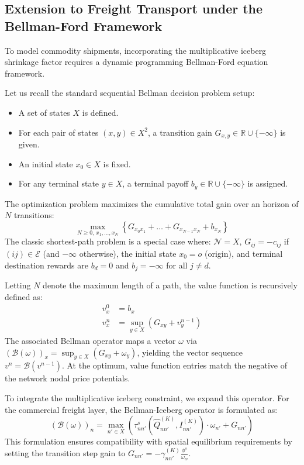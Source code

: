 \documentclass[11pt,a4paper]{article}
\begin{document}
\subsection{Extension to Freight Transport under the Bellman-Ford Framework}

To model commodity shipments, incorporating the multiplicative iceberg shrinkage factor requires a dynamic programming Bellman-Ford equation framework.

Let us recall the standard sequential Bellman decision problem setup:
\begin{itemize}
    \item A set of states $X$ is defined.
    \item For each pair of states $(x,y) \in X^2$, a transition gain $G_{x,y} \in \mathbb{R} \cup \{-\infty \}$ is given.
    \item An initial state $x_0 \in X$ is fixed.
    \item For any terminal state $y \in X$, a terminal payoff $b_y \in \mathbb{R} \cup \{ - \infty\}$ is assigned.
\end{itemize}
The optimization problem maximizes the cumulative total gain over an horizon of $N$ transitions:
\begin{equation}
    \max_{N \ge 0, \, x_1,\dots,x_N} \left\{ G_{x_0x_1} + \dots + G_{x_{N-1}x_N} + b_{x_N} \right\}
\end{equation}
The classic shortest-path problem is a special case where: $\mathcal{N} = X$, $G_{ij} = - c_{ij}$ if $(ij) \in \mathcal{E}$ (and $-\infty$ otherwise), the initial state $x_0 = o$ (origin), and terminal destination rewards are $b_d = 0$ and $b_j = -\infty$ for all $j \ne d$.

Letting $N$ denote the maximum length of a path, the value function is recursively defined as:
\begin{equation}
    \begin{aligned}
        v_x^0 &= b_x \\
        v_x^n &= \sup_{y \in X} \left( G_{xy} + v_y^{n-1} \right)
    \end{aligned}
\end{equation}
The associated Bellman operator maps a vector $\omega$ via $(\mathcal{B}(\omega))_x = \sup_{y \in X} (G_{xy} + \omega_y)$, yielding the vector sequence $v^n = \mathcal{B}(v^{n-1})$. At the optimum, value function entries match the negative of the network nodal price potentials.

To integrate the multiplicative iceberg constraint, we expand this operator. For the commercial freight layer, the Bellman-Iceberg operator is formulated as:
\begin{equation}
    (\mathcal{B}(\omega))_n = \max_{n' \in X} \left( \tau^s_{nn'}(\hat Q_{nn'}^{(K)}, I_{nn'}^{(K)}) \cdot \omega_{n'} + G_{nn'} \right)
\end{equation}
This formulation ensures compatibility with spatial equilibrium requirements by setting the transition step gain to $G_{nn'} = -\gamma_{nn'}^{(K)} \frac{\phi^s}{\omega_w}$.
\end{document}
